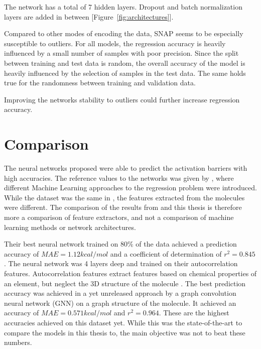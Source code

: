 The network has a total of 7 hidden layers.
Dropout and batch normalization layers are added in between [Figure~\ref{fig:architectures}].

Compared to other modes of encoding the data, SNAP seems to be especially susceptible to outliers.
For all models, the regression accuracy is heavily influenced by a small number of samples with poor precision.
Since the split between training and test data is random, the overall accuracy of the model is 
heavily influenced by the selection of samples in the test data.
The same holds true for the randomness between training and validation data.

Improving the networks stability to outliers could further increase regression accuracy.


\section{Comparison}
\label{sec:Evaluation:Comparison}

The neural networks proposed were able to predict the activation barriers with high accuracies.
The reference values to the networks was given by \cite{friederich_dos}, where different Machine Learning 
approaches to the regression problem were introduced.
While the dataset was the same in \cite{friederich_dos}, the features extracted from the molecules were different.
The comparison of the results from  and this thesis is therefore more 
a comparison of feature extractors, and not a comparison of machine learning methods or network architectures.

Their best neural network trained on 80\% of the data achieved a prediction accuracy of $MAE = 1.12 kcal/mol$ and a 
coefficient of determination of $r^2 = 0.845$.
The neural network was 4 layers deep and trained on their autocorrelation features.
Autocorrelation features extract features based on chemical properties of an element, but neglect the 
3D structure of the molecule \cite{friederich_dos}.
The best prediction accuracy was achieved in a yet unreleased approach by a graph convolution neural network (GNN) on 
a graph structure of the molecule.
It achieved an accuracy of $MAE = 0.571 kcal/mol$ and $r^2=0.964$.
These are the highest accuracies achieved on this dataset yet.
While this was the state-of-the-art to compare the models in this thesis to, the main objective was not to beat these numbers.

